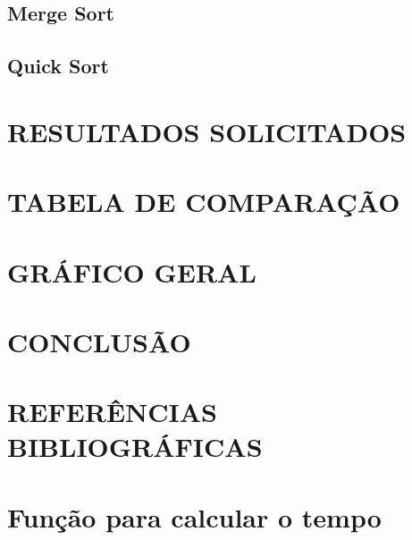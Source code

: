 \documentclass[12pt,arial]{article}
\begin{document}
		\subsection{Merge Sort}
		
		\newpage

		\subsection{Quick Sort}
		
		\newpage

		\section{RESULTADOS SOLICITADOS}
		
		\newpage

		\section{TABELA DE COMPARAÇÃO}
		
		\newpage

		\section{GRÁFICO GERAL}
		
		\newpage

		\section{CONCLUSÃO}
		
		\newpage

		\section{REFERÊNCIAS BIBLIOGRÁFICAS}
		

		\section{Função para calcular o tempo}
		
\end{document}
